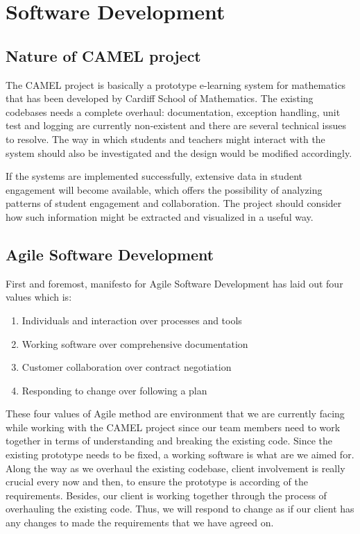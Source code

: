 

\section{Software Development}

\subsection*{Nature of CAMEL project}
The CAMEL project is basically a prototype e-learning system for mathematics that has been developed by Cardiff School of Mathematics. The existing codebases needs a complete overhaul: documentation, exception handling, unit test and logging are currently non-existent and there are several technical issues to resolve. The way in which students and teachers might interact with the system should also be investigated and the design would be modified accordingly.
 
	If the systems are implemented successfully, extensive data in student engagement will become available, which offers the possibility of analyzing patterns of student engagement and collaboration. The project should consider how such information might be extracted and visualized in a useful way. 

\subsection*{Agile Software Development}
First and foremost, manifesto for Agile Software Development has laid out four values which is:

\begin{enumerate}[label=(\roman*)] %
\item Individuals and interaction over processes and tools
\item Working software over comprehensive documentation
\item Customer collaboration over contract negotiation
\item Responding to change over following a plan 
\end{enumerate}

These four values of Agile method are environment that we are currently facing while working with the CAMEL project since our team members need to work together in terms of understanding and breaking the existing code. Since the existing prototype needs to be fixed, a working software is what are we aimed for. Along the way as we overhaul the existing codebase, client involvement is really crucial every now and then, to ensure the prototype is according of the requirements. Besides, our client is working together through the process of overhauling the existing code. Thus, we will respond to change as if our client has any changes to made the requirements that we have agreed on.  

